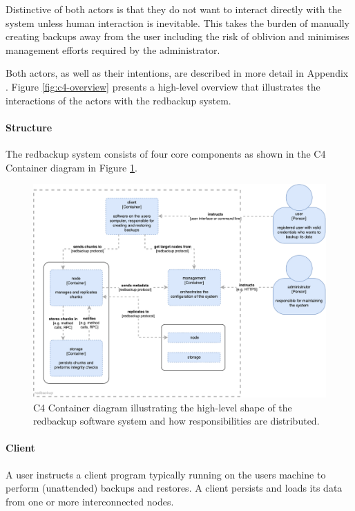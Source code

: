 Distinctive of both actors is that they do not want to interact directly with the system unless human interaction is inevitable. This takes the burden of manually creating backups away from the user including the risk of oblivion and minimises management efforts required by the administrator.  

Both actors, as well as their intentions, are described in more detail in Appendix . Figure \ref{fig:c4-overview} presents a high-level overview that illustrates the interactions of the actors with the redbackup system.

\paragraph{Structure}
The redbackup system consists of four core components as shown in the C4 Container diagram in Figure \ref{fig:c4-container}.

\begin{figure}[h]
	\centering
	\includegraphics[width=1\linewidth]{resources/c4-container}
	\caption[C4 Container diagram]{C4 Container diagram illustrating the high-level shape of the redbackup software system and how responsibilities are distributed.}
	\label{fig:c4-container}
\end{figure}

\paragraph{Client} A \gls{user} instructs a \gls{client} program typically running on the users machine to perform (unattended) backups and restores.  A \gls{client} persists and loads its data from one or more interconnected \glspl{node}.

